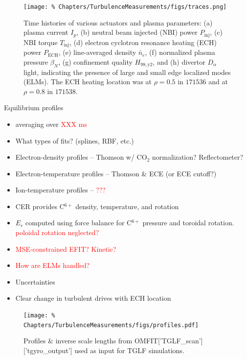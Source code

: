 \begin{figure}
  \centering
  \texttt{[image: \%
    Chapters/TurbulenceMeasurements/figs/traces.png]}
  \caption[Time histories of various actuators \& plasma parameters]{%
    Time histories of various actuators and plasma parameters:
    (a) plasma current $I_p$,
    (b) neutral beam injected (NBI) power $P_{\text{inj}}$,
    (c) NBI torque $T_{\text{inj}}$,
    (d) electron cyclotron resonance heating (ECH) power $P_{\text{ECH}}$,
    (e) line-averaged density $\bar{n}_e$,
    (f) normalized plasma pressure $\beta_N$,
    (g) confinement quality $H_{98,\text{y}2}$, and
    (h) divertor $D_{\alpha}$ light, indicating
    the presence of large and small edge localized modes (ELMs).
    The ECH heating location was
    at $\rho = 0.5$ in $171536$ and
    at $\rho = 0.8$ in $171538$.
  }
\label{fig:TurbulenceMeasurements:traces}
\end{figure}

Equilibrium profiles
\begin{itemize}
  \item averaging over \textcolor{red}{XXX ms}
  \item What types of fits? (splines, RBF, etc.)
  \item Electron-density profiles -- Thomson w/ CO$_2$ normalization?
    Reflectometer?
  \item Electron-temperature profiles -- Thomson \& ECE (or ECE cutoff?)
  \item Ion-temperature profiles -- \textcolor{red}{???}
  \item CER provides C$^{6+}$ density, temperature, and rotation
  \item $E_r$ computed using force balance for
    C$^{6+}$ pressure and toroidal rotation.
    \textcolor{red}{poloidal rotation neglected?}
  \item \textcolor{red}{MSE-constrained EFIT? Kinetic?}
  \item \textcolor{red}{How are ELMs handled?}
  \item Uncertainties
  \item Clear change in turbulent drives with ECH location
\end{itemize}

\begin{figure}
  \centering
  \texttt{[image: \%
    Chapters/TurbulenceMeasurements/figs/profiles.pdf]}
  \caption[Profiles \& inverse scale lengths]{%
    Profiles \& inverse scale lengths from
    OMFIT['TGLF\_scan']['tgyro\_output']
    used as input for TGLF simulations.
  }
\label{fig:TurbulenceMeasurements:profiles}
\end{figure}

